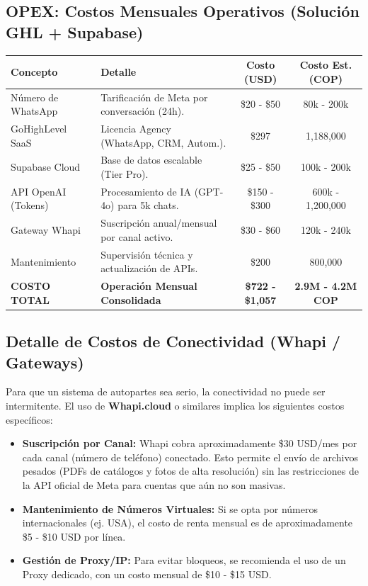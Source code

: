 \documentclass[12pt,a4paper]{article}
\begin{document}
\subsection{OPEX: Costos Mensuales Operativos (Solución GHL + Supabase)}
\begin{table}[h]
\centering
\small
\begin{tabular}{|l|p{6cm}|c|c|}
\hline
\rowcolor{primaryblue!10} \textbf{Concepto} & \textbf{Detalle} & \textbf{Costo (USD)} & \textbf{Costo Est. (COP)} \\ \hline
Número de WhatsApp & Tarificación de Meta por conversación (24h). & \$20 - \$50 & 80k - 200k \\ \hline
GoHighLevel SaaS & Licencia Agency (WhatsApp, CRM, Autom.). & \$297 & 1,188,000 \\ \hline
Supabase Cloud & Base de datos escalable (Tier Pro). & \$25 - \$50 & 100k - 200k \\ \hline
API OpenAI (Tokens) & Procesamiento de IA (GPT-4o) para 5k chats. & \$150 - \$300 & 600k - 1,200,000 \\ \hline
Gateway Whapi & Suscripción anual/mensual por canal activo. & \$30 - \$60 & 120k - 240k \\ \hline
Mantenimiento & Supervisión t\'ecnica y actualización de APIs. & \$200 & 800,000 \\ \hline
\rowcolor{gray!20} \textbf{COSTO TOTAL} & \textbf{Operación Mensual Consolidada} & \textbf{\$722 - \$1,057} & \textbf{2.9M - 4.2M COP} \\ \hline
\end{tabular}
\end{table}

\subsection{Detalle de Costos de Conectividad (Whapi / Gateways)}
Para que un sistema de autopartes sea serio, la conectividad no puede ser intermitente. El uso de \textbf{Whapi.cloud} o similares implica los siguientes costos específicos:
\begin{itemize}
    \item \textbf{Suscripción por Canal:} Whapi cobra aproximadamente \$30 USD/mes por cada canal (número de teléfono) conectado. Esto permite el envío de archivos pesados (PDFs de catálogos y fotos de alta resolución) sin las restricciones de la API oficial de Meta para cuentas que aún no son masivas.
    \item \textbf{Mantenimiento de Números Virtuales:} Si se opta por números internacionales (ej. USA), el costo de renta mensual es de aproximadamente \$5 - \$10 USD por línea.
    \item \textbf{Gestión de Proxy/IP:} Para evitar bloqueos, se recomienda el uso de un Proxy dedicado, con un costo mensual de \$10 - \$15 USD.
\end{itemize}
\end{document}
